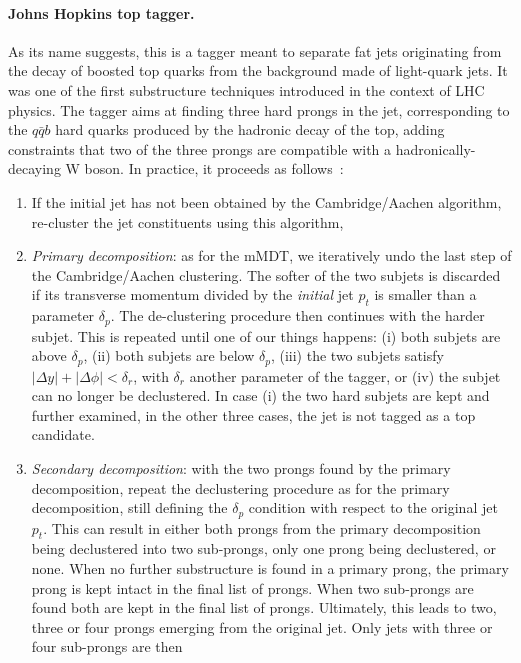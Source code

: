 \paragraph{Johns Hopkins top tagger.} As its name suggests, this is a
tagger meant to separate fat jets originating from the decay of
boosted top quarks from the background made of light-quark jets.
%
It was one of the first substructure techniques introduced in the
context of LHC physics.
%
The tagger aims at finding three hard prongs in the jet, corresponding
to the $q\bar q b$ hard quarks produced by the hadronic decay of the
top, adding constraints that two of the three prongs are compatible
with a hadronically-decaying W boson.
%
In practice, it proceeds as follows~\cite{Kaplan:2008ie}:
%
\begin{enumerate}
\item If the initial jet has not been obtained by the Cambridge/Aachen
  algorithm, re-cluster the jet constituents using this algorithm,
\item {\em Primary decomposition}: as for the mMDT, we iteratively
  undo the last step of the Cambridge/Aachen clustering. The softer of the two
  subjets is discarded if its transverse momentum divided by the {\em
    initial} jet $p_t$ is smaller than a parameter $\delta_p$. The
  de-clustering procedure then continues with the harder subjet.
  This is repeated until one of our things happens: (i) both subjets are
  above $\delta_p$, (ii) both subjets are below $\delta_p$, (iii) the
  two subjets satisfy $|\Delta y|+|\Delta \phi|<\delta_r$, with
  $\delta_r$ another parameter of the tagger, or (iv) the subjet can
  no longer be declustered. In case (i) the two hard subjets are kept
  and further examined, in the other three cases, the jet is not
  tagged as a top candidate.
\item {\em Secondary decomposition}: with the two prongs found by the
  primary decomposition, repeat the declustering procedure as for the
  primary decomposition, still defining the $\delta_p$ condition with respect to
  the original jet $p_t$.
  This can result in either both prongs from the primary decomposition
  being declustered into two sub-prongs, only one prong being
  declustered, or none.
  When no further substructure is found in a primary prong, the
  primary prong is kept intact in the final list of prongs. When two
  sub-prongs are found both are kept in the final list of prongs.
  Ultimately, this leads to two, three or four prongs emerging from
  the original jet. Only jets with three or four sub-prongs are then

\end{enumerate}

